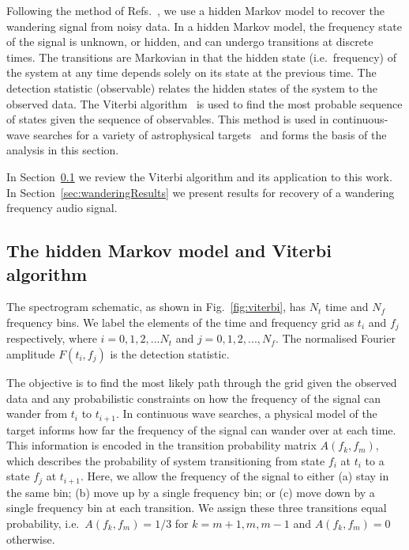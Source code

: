 \documentclass[paper-main.tex]{subfiles}
\begin{document}
Following the method of Refs.~\cite{SuvorovaEtAl:2016,SuvorovaEtAl:2017}, we use a hidden Markov model to recover the wandering signal from noisy data. 
In a hidden Markov model, the frequency state of the signal is unknown, or hidden, and can undergo transitions at discrete times. 
The transitions are Markovian in that the hidden state (i.e.\ frequency) of the system at any time depends solely on its state at the previous time. The detection statistic (observable) relates the hidden states of the system to the observed data.
The Viterbi algorithm~\cite{Viterbi:1967} is used to find the most probable sequence of states given the sequence of observables.
This method is used in continuous-wave searches for a variety of astrophysical targets~\cite{ScoX1O2Viterbi:2019, ScoX1ViterbiO1:2017, MillhouseStrangMelatos:2020, JonesSun:2020, MiddletonEtAlO2LMXBs:2020, PostMergerRemnantSearch:2019, SunEtAlSNR:2018, viterbi_application} and forms the basis of the analysis in this section. 
 

In Section~\ref{sec:viterbi} we review the Viterbi algorithm and its application to this work. 
In Section~\ref{sec:wanderingResults} we present results for recovery of a wandering frequency audio signal. 






\subsection{The hidden Markov model and Viterbi algorithm}
\label{sec:viterbi}



The spectrogram schematic, as shown in Fig.~\ref{fig:viterbi}, has $N_t$ time and $N_f$ frequency bins. 
We label the elements of the time and frequency  grid as $t_i$ and $f_j$ respectively, where $i=0,1,2,...N_t$ and $j=0,1,2,...,N_f$. 
The normalised Fourier amplitude $F(t_i,f_j)$ is the detection statistic. 


The objective is to find the most likely path through the grid given the observed data and any probabilistic constraints on how the frequency of the signal can wander from $t_i$ to $t_{i+1}$. In continuous wave searches, a physical model of the target informs how far the frequency of the signal can wander over at each time. This information is encoded in the transition probability matrix $A(f_k,f_m)$, which describes the probability of system transitioning from state $f_i$ at $t_i$ to a state $f_{j}$ at $t_{i+1}$. Here, we allow the frequency of the signal to either (a) stay in the same bin; (b) move up by a single frequency bin; or (c) move down by a single frequency bin at each transition. We assign these three transitions equal probability, i.e.\ $A(f_k,f_m)=1/3$ for $k=m+1,m,m-1$ and $A(f_k,f_m)=0$ otherwise.
\end{document}
